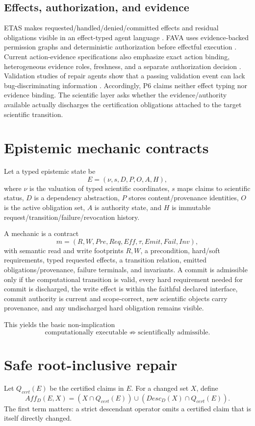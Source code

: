 \documentclass[11pt]{article}
\begin{document}
\subsection{Effects, authorization, and evidence}
ETAS makes requested\slash handled\slash denied\slash committed effects and residual obligations visible in an effect-typed agent language \cite{etas2026}. FAVA uses evidence-backed permission graphs and deterministic authorization before effectful execution \cite{fava2026}. Current action-evidence specifications also emphasize exact action binding, heterogeneous evidence roles, freshness, and a separate authorization decision \cite{aeb2026,aec2026}. Validation studies of repair agents show that a passing validation event can lack bug-discriminating information \cite{validation2026}. Accordingly, P6 claims neither effect typing nor evidence binding. The scientific layer asks whether the evidence/authority available actually discharges the certification obligations attached to the target scientific transition.

\section{Epistemic mechanic contracts}
Let a typed epistemic state be
\[
E=(\nu,s,D,P,O,A,H),
\]
where $\nu$ is the valuation of typed scientific coordinates, $s$ maps claims to scientific status, $D$ is a dependency abstraction, $P$ stores content/provenance identities, $O$ is the active obligation set, $A$ is authority state, and $H$ is immutable request\slash transition\slash failure\slash revocation history.

A mechanic is a contract
\[
m=(R,W,Pre,Req,Eff,\tau,Emit,Fail,Inv),
\]
with semantic read and write footprints $R,W$, a precondition, hard/soft requirements, typed requested effects, a transition relation, emitted obligations\slash provenance, failure terminals, and invariants. A commit is admissible only if the computational transition is valid, every hard requirement needed for commit is discharged, the write effect is within the faithful declared interface, commit authority is current and scope-correct, new scientific objects carry provenance, and any undischarged hard obligation remains visible.

This yields the basic non-implication
\[
\text{computationally executable}\not\Rightarrow\text{scientifically admissible}.
\]

\section{Safe root-inclusive repair}
Let $Q_{cert}(E)$ be the certified claims in $E$. For a changed set $X$, define
\[
Aff_D(E,X)=(X\cap Q_{cert}(E))\cup(Desc_D(X)\cap Q_{cert}(E)).
\]
The first term matters: a strict descendant operator omits a certified claim that is itself directly changed.
\end{document}
